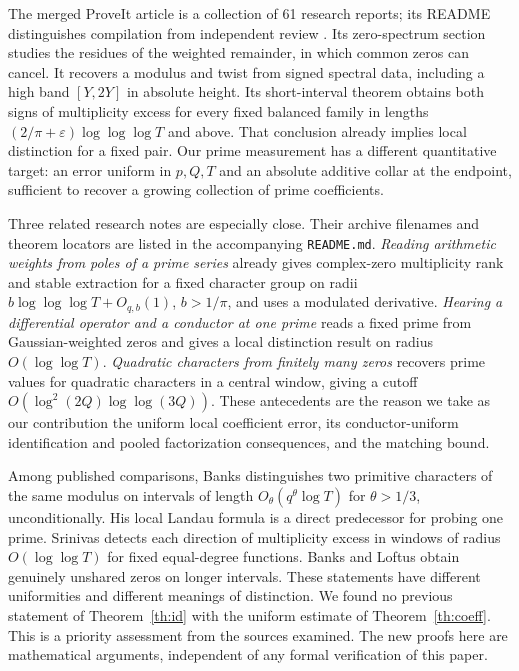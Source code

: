 \documentclass[11pt]{article}
\newcommand{\eps}{\varepsilon}
\begin{document}
The merged ProveIt article is a collection of 61 research reports; its README distinguishes compilation from independent review \cite{ProveIt}. Its zero-spectrum section studies the residues of the weighted remainder, in which common zeros can cancel. It recovers a modulus and twist from signed spectral data, including a high band $[Y,2Y]$ in absolute height. Its short-interval theorem obtains both signs of multiplicity excess for every fixed balanced family in lengths $(2/\pi+\eps)\log\log\log T$ and above. That conclusion already implies local distinction for a fixed pair. Our prime measurement has a different quantitative target: an error uniform in $p,Q,T$ and an absolute additive collar at the endpoint, sufficient to recover a growing collection of prime coefficients.

Three related research notes are especially close. Their archive filenames and theorem locators are listed in the accompanying \texttt{README.md}. \emph{Reading arithmetic weights from poles of a prime series} already gives complex-zero multiplicity rank and stable extraction for a fixed character group on radii $b\log\log\log T+O_{q,b}(1)$, $b>1/\pi$, and uses a modulated derivative. \emph{Hearing a differential operator and a conductor at one prime} reads a fixed prime from Gaussian-weighted zeros and gives a local distinction result on radius $O(\log\log T)$. \emph{Quadratic characters from finitely many zeros} recovers prime values for quadratic characters in a central window, giving a cutoff $O(\log^2(2Q)\log\log(3Q))$. These antecedents are the reason we take as our contribution the uniform local coefficient error, its conductor-uniform identification and pooled factorization consequences, and the matching bound.

Among published comparisons, Banks \cite{Banks} distinguishes two primitive characters of the same modulus on intervals of length $O_\theta(q^\theta\log T)$ for $\theta>1/3$, unconditionally. His local Landau formula is a direct predecessor for probing one prime. Srinivas \cite{Srinivas} detects each direction of multiplicity excess in windows of radius $O(\log\log T)$ for fixed equal-degree functions. Banks and Loftus \cite{Loftus} obtain genuinely unshared zeros on longer intervals. These statements have different uniformities and different meanings of distinction. We found no previous statement of Theorem~\ref{th:id} with the uniform estimate of Theorem~\ref{th:coeff}. This is a priority assessment from the sources examined. The new proofs here are mathematical arguments, independent of any formal verification of this paper.
\end{document}
